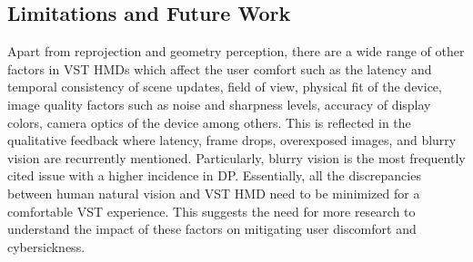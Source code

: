 \subsection{Limitations and Future Work}
Apart from reprojection and geometry perception, there are a wide range of other factors in VST HMDs which affect the user comfort such as the latency and temporal consistency of scene updates, field of view, physical fit of the device, image quality factors such as noise and sharpness levels, accuracy of display colors, camera optics of the device among others. 
This is reflected in the qualitative feedback where latency, frame drops, overexposed images, and blurry vision are recurrently mentioned. Particularly, blurry vision is the most frequently cited issue with a higher incidence in DP. Essentially, all the discrepancies between human natural vision and VST HMD need to be minimized for a comfortable VST experience. %
This suggests the need for more research to understand the impact of these factors on mitigating user discomfort and cybersickness. 



